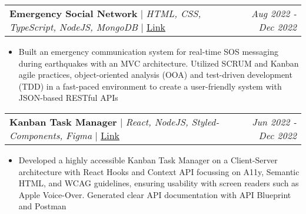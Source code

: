 \documentclass[letterpaper]{article}
\makeatletter
\newcommand{\resumeItemWithoutTitle}[1]{
  \item{
    {#1 \vspace{-4pt}}
  }
}
\newcommand{\projectHeading}[4]{
  \begin{tabular*}{\textwidth}{l@{\extracolsep{\fill}}r}
        \textbf{#1} 
        \hspace{-2pt} $\vert$ \hspace{-2pt} {\textit{#2}} 
        \hspace{-2pt} $\vert$ \hspace{-2pt} \href{#3}{ \underline{Link}}
        &
        \textit{#4} \\
    \end{tabular*}\vspace{-2pt}
}
\newcommand{\projectHeadingWithoutLink}[3]{
  \begin{tabular*}{\textwidth}{l@{\extracolsep{\fill}}r}
        \textbf{#1} 
        \hspace{-2pt} $\vert$ \hspace{-2pt} {\textit{#2}}
        & 
        \textit{#3} \\
    \end{tabular*}\vspace{-2pt}
}
\newcommand{\resumeItemListStart}{\begin{itemize}}
\newcommand{\resumeItemListEnd}{\end{itemize}}
\makeatother
\begin{document}
\vspace{3pt}
\projectHeading {Emergency Social Network}{HTML, CSS, TypeScript, NodeJS, MongoDB}{https://esn.onrender.com}{Aug 2022 - Dec 2022}
\resumeItemListStart
\resumeItemWithoutTitle{Built an emergency communication system for real-time SOS messaging during earthquakes with an MVC architecture. Utilized SCRUM and Kanban agile practices, object-oriented analysis (OOA) and test-driven development (TDD) in a fast-paced environment to create a user-friendly system with JSON-based RESTful APIs}
\resumeItemListEnd

\vspace{3pt}
\projectHeading {Kanban Task Manager}{React, NodeJS, Styled-Components, Figma}{https://kanbhan.netlify.app}{Jun 2022 - Dec 2022}
\resumeItemListStart
\resumeItemWithoutTitle{Developed a highly accessible Kanban Task Manager on a Client-Server architecture with React Hooks and Context API focussing on A11y, Semantic HTML, and WCAG guidelines, ensuring usability with screen readers such as Apple Voice-Over. Generated clear API documentation with API Blueprint and Postman}
\resumeItemListEnd



\end{document}
